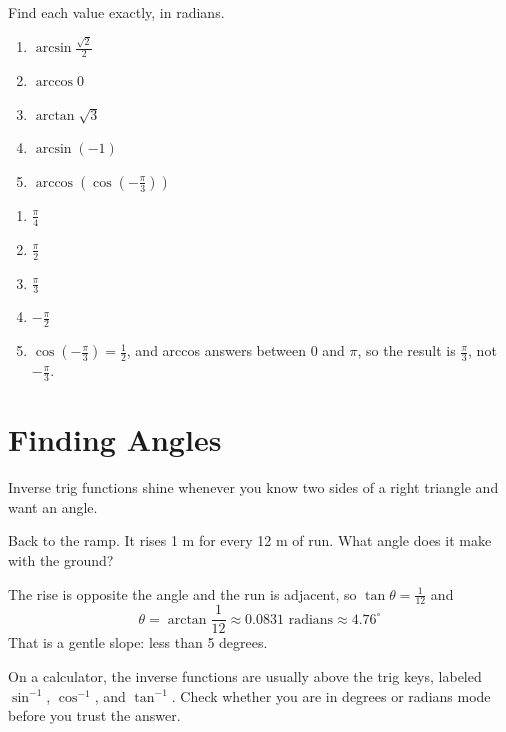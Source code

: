 \begin{Exercise}[title={Exact values}, label=itrig_exact]
Find each value exactly, in radians.
\begin{enumerate}
\item $\arcsin\frac{\sqrt{2}}{2}$
\item $\arccos 0$
\item $\arctan\sqrt{3}$
\item $\arcsin(-1)$
\item $\arccos\left(\cos\left(-\frac{\pi}{3}\right)\right)$
\end{enumerate}
\end{Exercise}
\begin{Answer}[ref=itrig_exact]
\begin{enumerate}
\item $\frac{\pi}{4}$
\item $\frac{\pi}{2}$
\item $\frac{\pi}{3}$
\item $-\frac{\pi}{2}$
\item $\cos\left(-\frac{\pi}{3}\right) = \frac{1}{2}$, and arccos answers
      between $0$ and $\pi$, so the result is $\frac{\pi}{3}$, not
      $-\frac{\pi}{3}$.
\end{enumerate}
\end{Answer}

\section{Finding Angles}

Inverse trig functions shine whenever you know two sides of a right
triangle and want an angle.

\begin{Worked}
\begin{Problem}
Back to the ramp. It rises 1 m for every 12 m of
run. What angle does it make with the ground?
\end{Problem}
\begin{Solution}
The rise is opposite the angle and the run is adjacent,
so $\tan\theta = \frac{1}{12}$ and
$$\theta = \arctan\frac{1}{12} \approx 0.0831 \text{ radians} \approx 4.76^\circ$$
That is a gentle slope: less than 5 degrees.
\end{Solution}
\end{Worked}

On a calculator, the inverse functions are usually above the trig keys,
labeled $\sin^{-1}$, $\cos^{-1}$, and $\tan^{-1}$. Check whether you are in
degrees or radians mode before you trust the answer.

